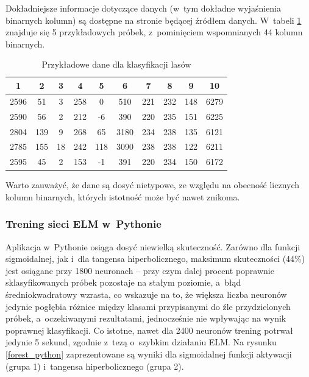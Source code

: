 \documentclass{article}
\begin{document}
Dokładniejsze informacje dotyczące danych (w~tym dokładne wyjaśnienia binarnych kolumn) są dostępne na stronie będącej źródłem danych. W~tabeli \ref{forest_first_5} znajduje się 5 przykładowych próbek, z~pominięciem wspomnianych 44 kolumn binarnych.
\begin{table}[H]
\caption{Przykładowe dane dla klasyfikacji lasów}
\label{forest_first_5}
\centering
\begin{tabular}{|c|c|c|c|c|c|c|c|c|c|}
\hline
\textbf{1} & \textbf{2} & \textbf{3} & \textbf{4} & \textbf{5} & \textbf{6} & \textbf{7} & \textbf{8} & \textbf{9} & \textbf{10} \\
\hline
2596 & 51 & 3 & 258 & 0 & 510 & 221 & 232 & 148 & 6279 \\
2590 & 56 & 2 & 212 & -6 & 390 & 220 & 235 & 151 & 6225 \\
2804 & 139 & 9 & 268 & 65 & 3180 & 234 & 238 & 135 & 6121 \\
2785 & 155 & 18 & 242 & 118 & 3090 & 238 & 238 & 122 & 6211 \\
2595 & 45 & 2 & 153 & -1 & 391 & 220 & 234 & 150 & 6172 \\
\hline
\end{tabular}
\end{table}

Warto zauważyć, że dane są dosyć nietypowe, ze względu na obecność licznych kolumn binarnych, których istotność może być nawet znikoma.
\subsubsection{Trening sieci ELM w~Pythonie}
Aplikacja w~Pythonie osiąga dosyć niewielką skuteczność. Zarówno dla funkcji sigmoidalnej, jak i~dla tangensa hiperbolicznego, maksimum skuteczności (44\%) jest osiągane przy 1800 neuronach -- przy czym dalej procent poprawnie sklasyfikowanych próbek pozostaje na stałym poziomie, a~błąd średniokwadratowy wzrasta, co wskazuje na to, że większa liczba neuronów jedynie pogłębia różnice między klasami przypisanymi do źle przydzielonych próbek, a~oczekiwanymi rezultatami, jednocześnie nie wpływając na wynik poprawnej klasyfikacji. Co istotne, nawet dla 2400 neuronów trening potrwał jedynie 5 sekund, zgodnie z~tezą o~szybkim działaniu ELM. 
Na rysunku \ref{forest_python} zaprezentowane są wyniki dla sigmoidalnej funkcji aktywacji (grupa 1) i~tangensa hiperbolicznego (grupa 2). 
\end{document}
